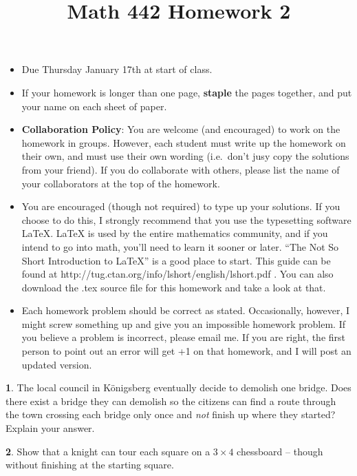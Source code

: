 \documentclass[12pt]{article}
\title{Math 442 Homework 2}
\date{}
\theoremstyle{definition}
\newtheorem{problem}{}
\begin{document}
%
%
\maketitle
%
\vspace{-16 mm}
\begin{itemize}
\item Due Thursday January 17th at start of class.
%
\item If your homework is longer than one page, {\bf staple} the pages together, and put your name on each sheet of paper.
%
\item {\bf Collaboration Policy}: You are welcome (and encouraged) to work on the homework in groups. However, each student must write up the homework on their own, and must use their own wording (i.e.~don't jusy copy the solutions from your friend). If you do collaborate with others, please list the name of your collaborators at the top of the homework.

\item You are encouraged (though not required) to type up your solutions. If you choose to do this, I strongly recommend that you use the typesetting software LaTeX. LaTeX is used by the entire mathematics community, and if you intend to go into math, you’ll need to learn it sooner or later. ``The Not So Short Introduction to LaTeX'' is a good place to start. This guide can be found at http://tug.ctan.org/info/lshort/english/lshort.pdf . You can also download the .tex source file for this homework and take a look at that.

\item Each homework problem should be correct as stated. Occasionally, however, I might screw something up and give you an impossible homework problem. If you believe a problem is incorrect, please email me. If you are right, the first person to point out an error will get +1 on that homework, and I will post an updated version. 
\end{itemize}



\begin{problem}
The local council in K\"onigsberg eventually decide to demolish one bridge. Does there exist  a bridge they can demolish so the citizens can find a route through the town crossing each bridge only once and \emph{not} finish up where they started? Explain your answer.
\end{problem}


\begin{problem}
Show that a knight can tour each square on a $3\times 4$ chessboard -- though without finishing at the starting square.
\end{problem}
\end{document}
